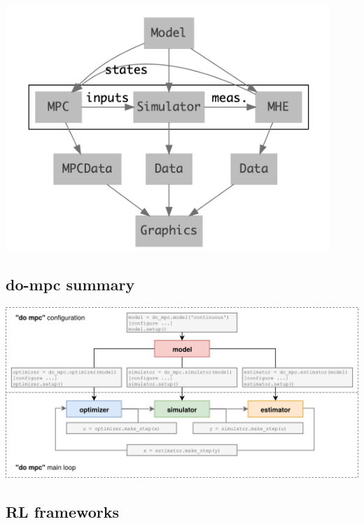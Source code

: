 \documentclass[
  letterpaper,
  DIV=11,
  numbers=noendperiod,
  oneside]{scrartcl}
\begin{document}
\begin{center}
\includegraphics[width=\textwidth,height=3.64583in]{figs/do_mpc_api.png}
\end{center}

\subsection{do-mpc summary}\label{do-mpc-summary}

\begin{center}
\includegraphics{figs/do_mpc_flow_sheet.png}
\end{center}

\subsection{RL frameworks}\label{rl-frameworks}
\end{document}
